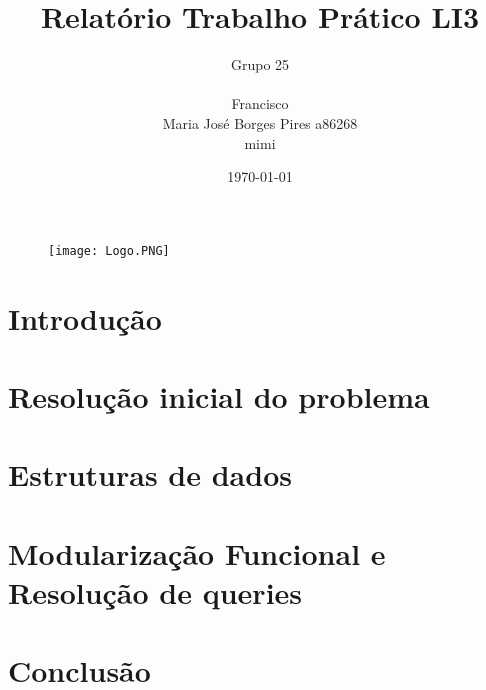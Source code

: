 \documentclass[a4paper]{report} %
\begin{document}
\begin{figure}[tb]
\begin{center}
\texttt{[image: Logo.PNG]}
\end{center}
\end{figure}

\title{Relatório Trabalho Prático LI3}
\author{Grupo 25\\
\\
Francisco \\
Maria José Borges Pires a86268 \\
mimi }
\date{\today}

\maketitle

\tableofcontents

\listoffigures


\chapter{Introdução}


  


\chapter{Resolução inicial do problema}





\chapter{Estruturas de dados}

\chapter{Modularização Funcional e Resolução de queries}











\chapter{Conclusão}





   
\end{document}
